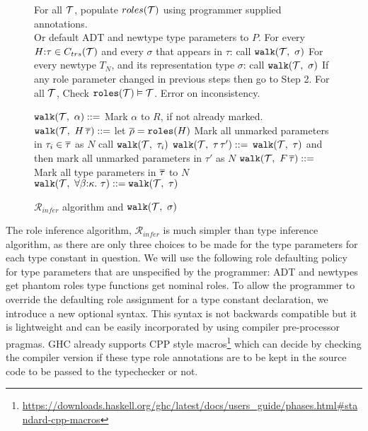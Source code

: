 \documentclass[screen,nonacm,manuscript,review]{acmart} %
\begin{document}
\newcommand\RoleInfer{$\mathcal{R}_{infer}$\xspace}
\newcommand\walk[2]{\texttt{walk}(#1,~#2)}
\begin{figure}[ht]
  \begin{algorithmic}[1]
    \Procedure{\RoleInfer}{[$\TypeConst$]}

    \State For all $\TypeConst$, populate $roles(\mathcal{T})$ using programmer supplied annotations. \\
    \qquad Or default ADT and newtype type parameters to $P$.
    \State For every $H{:}\tau \in C_{trs}(\mathcal{T})$ and every $\sigma$ that appears in $\tau$: call $\walk\TypeConst\sigma$\label{here}
    \State For every newtype $T_N$, and its representation type $\sigma$: call $\walk\TypeConst\sigma$
    \State If any role parameter changed in previous steps then go to Step 2.
    \State For all $\TypeConst$, Check $\texttt{roles}(\mathcal{T}) \mathrel{\vDash} \mathcal{T}$. Error on inconsistency.
    \EndProcedure
  \end{algorithmic}

  \begin{algorithmic}[1]
    \State $\walk \TypeConst {\alpha} \bnfeq$ Mark $\alpha$ to $R$, if not already marked.
    \State $\walk \TypeConst {H\App \many\tau} \bnfeq$ let $\overline{\rho} = \texttt{roles}(H)$
        \State Mark all unmarked parameters in $\tau_i \in \overline{\tau}$ as $N$
        \State call $\walk{\TypeConst}{\tau_i}$
    \EndIf
    \State $\walk \TypeConst {\tau\App\tau'} \bnfeq$ $\walk{\TypeConst}{\tau}$ and then mark all unmarked parameters in $\tau'$ as $N$
    \State $\walk \TypeConst {F\App\many\tau} \bnfeq$ Mark all type parameters in $\overline{\tau}$ to $N$
    \State $\walk \TypeConst {\Forall{\beta\co\kappa}\tau} \bnfeq \walk \TypeConst \tau$
    \EndProcedure
  \end{algorithmic}
\caption{\RoleInfer algorithm and $\walk\TypeConst\sigma$}\label{alg:role-infer}
\end{figure}

The role inference algorithm, \RoleInfer is much simpler than type inference algorithm, as there are only three choices to be made for the type parameters for each type constant in question. We will use the following role defaulting policy for type parameters that are unspecified by the programmer: ADT and newtypes get phantom roles type functions get nominal roles. To allow the programmer to override the defaulting role assignment for a type constant declaration, we introduce a new optional syntax.
This syntax is not backwards compatible but it is lightweight and can be easily incorporated by using compiler pre-processor pragmas. GHC already supports CPP style macros\footnote{\url{https://downloads.haskell.org/ghc/latest/docs/users\_guide/phases.html\#standard-cpp-macros}} which can decide by checking the compiler version if these type role annotations are to be kept in the source code to be passed to the typechecker or not.
\end{document}
